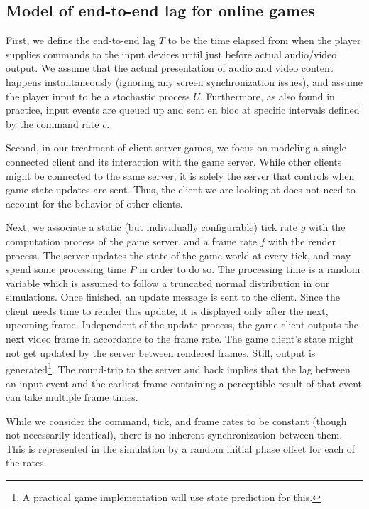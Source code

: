 \subsection{Model of end-to-end lag for online games}
First, we define the end-to-end lag $T$ to be the time elapsed 
from when the player supplies commands to the input devices until just 
before actual audio/video output.
We assume that the actual presentation of 
audio and video content happens instantaneously  
(ignoring any screen synchronization issues), and assume the player 
input to be a stochastic process $U$. %
Furthermore, as also found in practice, input events are queued up  
and sent en bloc at specific intervals defined by the command rate $c$.

Second, in our treatment of client-server games, we focus on modeling 
a single connected client and its interaction with the game server. 
While other clients might be connected to the same server, it is 
solely the server that controls when game state updates are sent. 
Thus, the client we are looking at does not need to account for the 
behavior of other clients.

Next, we associate a static (but individually configurable) tick 
rate $g$ with the computation process of the game server, and a frame rate $f$
with the render process. 
The server updates the state of the game world at every tick, and may 
spend some processing time $P$ in order to do so. The processing time is a random variable which is assumed to follow a truncated normal distribution in our simulations. Once finished, an update 
message is sent to the client. Since the client needs time to render 
this update, it is displayed only after the next, upcoming frame.
Independent of the update process, the game client outputs the next 
video frame in accordance to the frame rate. The game client's state 
might not get updated by the server between rendered frames. Still, 
output is generated\footnote{A practical game implementation will use state prediction for this.}.
The round-trip to the server and back implies that
the lag between an input event and the earliest frame containing a perceptible 
result of that event can take multiple frame times.

While we consider the command, tick, and frame rates to be constant 
(though not necessarily identical), there is no inherent synchronization 
between them. This is represented in the simulation by a random initial 
phase offset for each of the rates.

